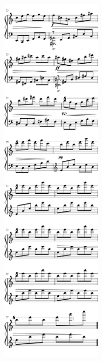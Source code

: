 \begin{rightcolumn*}
\noindent\includegraphics[width=2in]{assets/static/miniatures/2-2.png}
\end{rightcolumn*}
